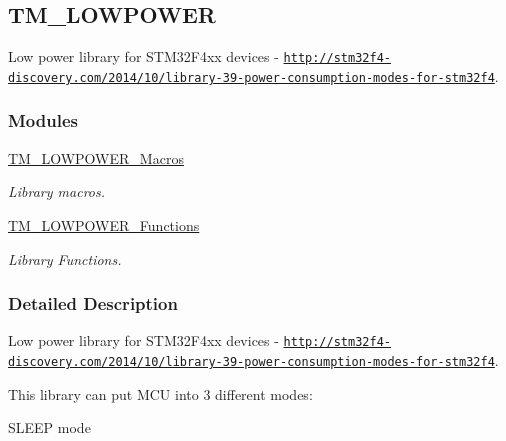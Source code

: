 \hypertarget{group___t_m___l_o_w_p_o_w_e_r}{}\subsection{T\+M\+\_\+\+L\+O\+W\+P\+O\+W\+E\+R}
\label{group___t_m___l_o_w_p_o_w_e_r}


Low power library for S\+T\+M32\+F4xx devices -\/ \href{http://stm32f4-discovery.com/2014/10/library-39-power-consumption-modes-for-stm32f4}{\tt http\+://stm32f4-\/discovery.\+com/2014/10/library-\/39-\/power-\/consumption-\/modes-\/for-\/stm32f4}.  


\subsubsection*{Modules}
\begin{DoxyCompactItemize}
\item 
\hyperlink{group___t_m___l_o_w_p_o_w_e_r___macros}{T\+M\+\_\+\+L\+O\+W\+P\+O\+W\+E\+R\+\_\+\+Macros}
\begin{DoxyCompactList}\small\item\em Library macros. \end{DoxyCompactList}\item 
\hyperlink{group___t_m___l_o_w_p_o_w_e_r___functions}{T\+M\+\_\+\+L\+O\+W\+P\+O\+W\+E\+R\+\_\+\+Functions}
\begin{DoxyCompactList}\small\item\em Library Functions. \end{DoxyCompactList}\end{DoxyCompactItemize}


\subsubsection{Detailed Description}
Low power library for S\+T\+M32\+F4xx devices -\/ \href{http://stm32f4-discovery.com/2014/10/library-39-power-consumption-modes-for-stm32f4}{\tt http\+://stm32f4-\/discovery.\+com/2014/10/library-\/39-\/power-\/consumption-\/modes-\/for-\/stm32f4}. 

This library can put M\+C\+U into 3 different modes\+:

\begin{DoxyParagraph}{S\+L\+E\+E\+P mode}

\end{DoxyParagraph}

